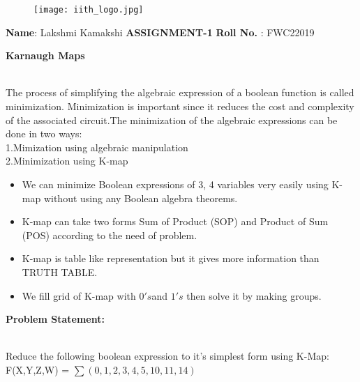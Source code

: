 \documentclass[10pt,a4paper]{report}
\begin{document}
\begin{figure*}[!tbp]
  \centering
  \begin{minipage}[b]{0.4\textwidth}
    \texttt{[image: iith\_logo.jpg]}
  \end{minipage}
  \hfill
\end{figure*}


\raggedright \textbf{Name}:\hspace{1mm} Lakshmi Kamakshi\hspace{3cm} \Large \textbf{ASSIGNMENT-1}\hspace{2.5cm} %
\normalsize \textbf{Roll No.} :\hspace{1mm} FWC22019\vspace{2cm}
\begin{multicols}{2}
\hspace{7.5cm} \textbf{Karnaugh Maps}\vspace{0.5cm}
\raggedright \\The process of simplifying the algebraic expression of a boolean function is called minimization. Minimization is important since it reduces the cost and complexity of the associated circuit.The minimization of the algebraic expressions can be done in two ways:\\1.Mimization using algebraic manipulation\\2.Minimization using K-map \vspace{3mm} \\ \begin{itemize}


\item We can minimize Boolean expressions of 3, 4 variables very easily using K-map without using any Boolean algebra theorems.
\item K-map can take two forms Sum of Product (SOP) and Product of Sum (POS) according to the need of problem. 
\item K-map is table like representation but it gives more information than TRUTH TABLE.
\item We fill grid of K-map with $0's $and $1's$ then solve it by making groups.\vspace{2mm}
\end{itemize}
\raggedright \textbf{Problem Statement:}\vspace{2mm}
\raggedright \\Reduce the following boolean expression to it's simplest form using K-Map:
\center F(X,Y,Z,W) = $\sum(0,1,2,3,4,5,10,11,14)$
\vspace{5mm}




\end{multicols}
\end{document}
